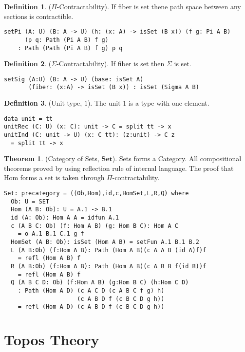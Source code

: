 \documentclass{article}
\theoremstyle{definition}
\newtheorem{definition}{Definition}
\newtheorem{theorem}{Theorem}
\begin{document}
\begin{definition} ($\Pi$-Contractability).
If fiber is set thene path space between any sections is contractible.
\begin{lstlisting}
setPi (A: U) (B: A -> U) (h: (x: A) -> isSet (B x)) (f g: Pi A B)
      (p q: Path (Pi A B) f g)
    : Path (Path (Pi A B) f g) p q
\end{lstlisting}
\end{definition}

\begin{definition} ($\Sigma$-Contractability).
If fiber is set then $\Sigma$ is set.
\begin{lstlisting}
setSig (A:U) (B: A -> U) (base: isSet A)
       (fiber: (x:A) -> isSet (B x)) : isSet (Sigma A B)
\end{lstlisting}
\end{definition}

\begin{definition} (Unit type, $1$).
The unit $1$ is a type with one element.
\begin{lstlisting}
data unit = tt
unitRec (C: U) (x: C): unit -> C = split tt -> x
unitInd (C: unit -> U) (x: C tt): (z:unit) -> C z
  = split tt -> x
\end{lstlisting}
\end{definition}

\begin{theorem} (Category of Sets, $\mathbf{Set}$).
Sets forms a Category.
All compositional theorems proved by using reflection rule of internal language.
The proof that $\mathrm{Hom}$ forms a set is taken through $\Pi$-contractability.
\begin{lstlisting}
Set: precategory = ((Ob,Hom),id,c,HomSet,L,R,Q) where
  Ob: U = SET
  Hom (A B: Ob): U = A.1 -> B.1
  id (A: Ob): Hom A A = idfun A.1
  c (A B C: Ob) (f: Hom A B) (g: Hom B C): Hom A C
    = o A.1 B.1 C.1 g f
  HomSet (A B: Ob): isSet (Hom A B) = setFun A.1 B.1 B.2
  L (A B:Ob) (f:Hom A B): Path (Hom A B)(c A A B (id A)f)f
    = refl (Hom A B) f
  R (A B:Ob) (f:Hom A B): Path (Hom A B)(c A B B f(id B))f
    = refl (Hom A B) f
  Q (A B C D: Ob) (f:Hom A B) (g:Hom B C) (h:Hom C D)
    : Path (Hom A D) (c A C D (c A B C f g) h)
                     (c A B D f (c B C D g h))
    = refl (Hom A D) (c A B D f (c B C D g h))
\end{lstlisting}
\end{theorem}

\section{Topos Theory}
\end{document}
